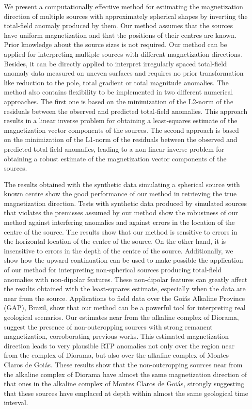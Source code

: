 \documentclass[journal abbreviation, npg]{copernicus}
\begin{document}
We present a computationally effective method for estimating the magnetization direction of multiple sources with approximately spherical shapes by inverting the total-field anomaly produced by them. Our method assumes that the sources have uniform magnetization and that the positions of their centres are known. Prior knowledge about the source sizes is not required. Our method can be applied for interpreting multiple sources with different magnetization directions. Besides, it can be directly applied to interpret irregularly spaced total-field anomaly data measured on uneven surfaces and requires no prior transformation like reduction to the pole, total gradient or total magnitude anomalies. The method also contains flexibility to be implemented in two different numerical approaches. The first one is based on the minimization of the L2-norm of the residuals between the observed and predicted total-field anomalies. This approach results in a linear inverse problem for obtaining a least-squares estimate of the magnetization vector components of the sources. The second approach is based on the minimization of the L1-norm of the residuals between the observed and predicted total-field anomalies, leading to a non-linear inverse problem for obtaining a robust estimate of the magnetization vector components of the sources.

The results obtained with the synthetic data simulating a spherical source with known centre show the good performance of our method in retrieving the true magnetization direction. Tests with synthetic data produced by simulated sources that violates the premisses assumed by our method show the robustness of our method against interfering anomalies and against errors in the location of the centre of the source. The results show that our method is sensitive to errors in the horizontal location of the centre of the source. On the other hand, it is insensitive to errors in the depth of the centre of the source. Additionally, we show how the upward continuation can be used to make possible the application of our method for interpreting non-spherical sources producing total-field anomalies with non-dipolar features. These non-dipolar features can greatly affect the results obtained with the least-squares estimate, especially when the data are near from the source. Applications to field data over the Goiás Alkaline Province (GAP), Brazil, show that our method can be a powerful tool for interpreting real geological scenarios. Our estimates near from the alkaline complex of Diorama, suggest the presence of non-outcropping sources with strong remanent magnetization, corroborating previous works. This estimated magnetization direction leads to very plausible RTP anomalies not only over the region near from the complex of Diorama, but also over the alkaline complex of Montes Claros de Goiás. These results show that the non-outcropping sources near from the alkaline complex of Diorama have almost the same magnetization direction of that ones in the alkaline complex of Montes Claros de Goiás, strongly suggesting that these sources have emplaced at depth within almost the same geological time interval. 
\end{document}
